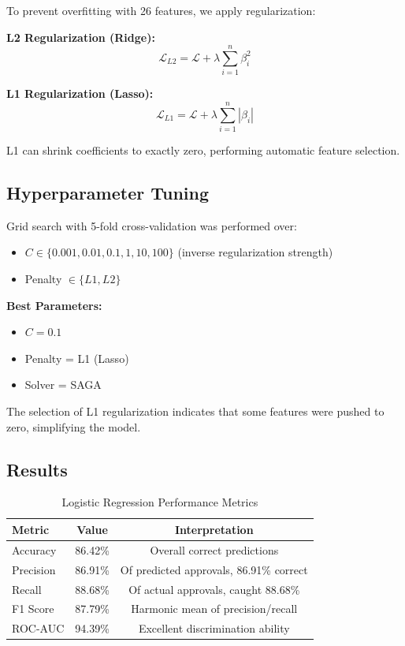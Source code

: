 \documentclass[12pt,a4paper]{article}
\begin{document}
To prevent overfitting with 26 features, we apply regularization:

\textbf{L2 Regularization (Ridge):}
\begin{equation}
\mathcal{L}_{L2} = \mathcal{L} + \lambda \sum_{i=1}^{n} \beta_i^2
\end{equation}

\textbf{L1 Regularization (Lasso):}
\begin{equation}
\mathcal{L}_{L1} = \mathcal{L} + \lambda \sum_{i=1}^{n} |\beta_i|
\end{equation}

L1 can shrink coefficients to exactly zero, performing automatic feature selection.

\subsection{Hyperparameter Tuning}

Grid search with 5-fold cross-validation was performed over:
\begin{itemize}
    \item $C \in \{0.001, 0.01, 0.1, 1, 10, 100\}$ (inverse regularization strength)
    \item Penalty $\in \{L1, L2\}$
\end{itemize}

\textbf{Best Parameters:}
\begin{itemize}
    \item $C = 0.1$
    \item Penalty = L1 (Lasso)
    \item Solver = SAGA
\end{itemize}

The selection of L1 regularization indicates that some features were pushed to zero, simplifying the model.

\subsection{Results}

\begin{table}[H]
\centering
\caption{Logistic Regression Performance Metrics}
\begin{tabular}{lcc}
\toprule
\textbf{Metric} & \textbf{Value} & \textbf{Interpretation} \\
\midrule
Accuracy & 86.42\% & Overall correct predictions \\
Precision & 86.91\% & Of predicted approvals, 86.91\% correct \\
Recall & 88.68\% & Of actual approvals, caught 88.68\% \\
F1 Score & 87.79\% & Harmonic mean of precision/recall \\
ROC-AUC & 94.39\% & Excellent discrimination ability \\
\bottomrule
\end{tabular}
\end{table}
\end{document}
